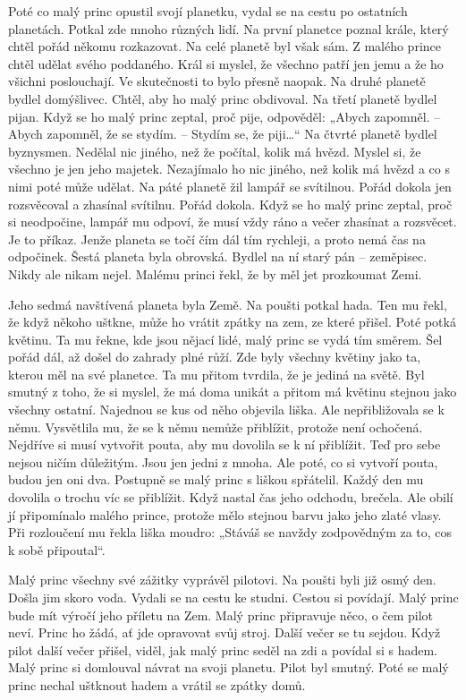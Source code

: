 \documentclass[../ctenarsky-denik.tex]{subfiles}
\begin{document}
Poté co malý princ opustil svojí planetku, vydal se na cestu po ostatních planetách. Potkal zde mnoho různých lidí. Na první planetce poznal krále, který chtěl pořád někomu rozkazovat. Na celé planetě byl však sám. Z malého prince chtěl udělat svého poddaného. Král si myslel, že všechno patří jen jemu a že ho všichni poslouchají. Ve skutečnosti to bylo přesně naopak. Na druhé planetě bydlel domýšlivec. Chtěl, aby ho malý princ obdivoval. Na třetí planetě bydlel pijan. Když se ho malý princ zeptal, proč pije, odpověděl: „Abych zapomněl. – Abych zapomněl, že se stydím. – Stydím se, že piji…“ Na čtvrté planetě bydlel byznysmen. Nedělal nic jiného, než že počítal, kolik má hvězd. Myslel si, že všechno je jen jeho majetek. Nezajímalo ho nic jiného, než kolik má hvězd a co s nimi poté může udělat. Na páté planetě žil lampář se svítilnou. Pořád dokola jen rozsvěcoval a zhasínal svítilnu. Pořád dokola. Když se ho malý princ zeptal, proč si neodpočine, lampář mu odpoví, že musí vždy ráno a večer zhasínat a rozsvěcet. Je to příkaz. Jenže planeta se točí čím dál tím rychleji, a proto nemá čas na odpočinek. Šestá planeta byla obrovská. Bydlel na ní starý pán – zeměpisec. Nikdy ale nikam nejel. Malému princi řekl, že by měl jet prozkoumat Zemi.

Jeho sedmá navštívená planeta byla Země. Na poušti potkal hada. Ten mu řekl, že když někoho uštkne, může ho vrátit zpátky na zem, ze které přišel. Poté potká květinu. Ta mu řekne, kde jsou nějací lidé, malý princ se vydá tím směrem.
Šel pořád dál, až došel do zahrady plné růží. Zde byly všechny květiny jako ta, kterou měl na své planetce. Ta mu přitom tvrdila, že je jediná na světě. Byl smutný z toho, že si myslel, že má doma unikát a přitom má květinu stejnou jako všechny ostatní.
Najednou se kus od něho objevila liška. Ale nepřibližovala se k němu. Vysvětlila mu, že se k němu nemůže přiblížit, protože není ochočená. Nejdříve si musí vytvořit pouta, aby mu dovolila se k ní přiblížit. Teď pro sebe nejsou ničím důležitým. Jsou jen jedni z mnoha. Ale poté, co si vytvoří pouta, budou jen oni dva. Postupně se malý princ s liškou spřátelil. Každý den mu dovolila o trochu víc se přiblížit. Když nastal čas jeho odchodu, brečela. Ale obilí jí připomínalo malého prince, protože mělo stejnou barvu jako jeho zlaté vlasy. Při rozloučení mu řekla liška moudro: „Stáváš se navždy zodpovědným za to, cos k sobě připoutal“.

Malý princ všechny své zážitky vyprávěl pilotovi. Na poušti byli již osmý den. Došla jim skoro voda. Vydali se na cestu ke studni. Cestou si povídají. Malý princ bude mít výročí jeho příletu na Zem. Malý princ připravuje něco, o čem pilot neví. Princ ho žádá, ať jde opravovat svůj stroj. Další večer se tu sejdou. Když pilot další večer přišel, viděl, jak malý princ seděl na zdi a povídal si s hadem. Malý princ si domlouval návrat na svoji planetu. Pilot byl smutný. Poté se malý princ nechal uštknout hadem a vrátil se zpátky domů.
\end{document}

